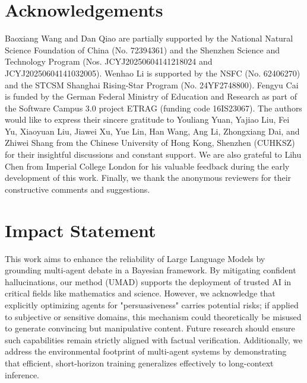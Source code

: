 \documentclass{article}
\theoremstyle{plain}
\theoremstyle{definition}
\theoremstyle{remark}
\begin{document}
\clearpage

\section*{Acknowledgements}
Baoxiang Wang and Dan Qiao are partially supported by the National Natural Science Foundation of China (No. 72394361) and the Shenzhen Science and Technology Program (Nos. JCYJ20250604141218024 and JCYJ20250604141032005). 
Wenhao Li is supported by the NSFC (No. 62406270) and the STCSM Shanghai Rising-Star Program (No. 24YF2748800). Fengyu Cai is funded by the German Federal Ministry of Education and Research as part of the Software Campus 3.0 project ETRAG (funding code 16IS23067). The authors would like to express their sincere gratitude to Youliang Yuan, Yajiao Liu, Fei Yu, Xiaoyuan Liu, Jiawei Xu, Yue Lin, Han Wang, Ang Li, Zhongxiang Dai, and Zhiwei Shang from the Chinese University of Hong Kong, Shenzhen (CUHKSZ) for their insightful discussions and constant support. 
We are also grateful to Lihu Chen from Imperial College London for his valuable feedback during the early development of this work. 
Finally, we thank the anonymous reviewers for their constructive comments and suggestions.

\section*{Impact Statement}

This work aims to enhance the reliability of Large Language Models by grounding multi-agent debate in a Bayesian framework. By mitigating confident hallucinations, our method (UMAD) supports the deployment of trusted AI in critical fields like mathematics and science. However, we acknowledge that explicitly optimizing agents for "persuasiveness" carries potential risks; if applied to subjective or sensitive domains, this mechanism could theoretically be misused to generate convincing but manipulative content. Future research should ensure such capabilities remain strictly aligned with factual verification. Additionally, we address the environmental footprint of multi-agent systems by demonstrating that efficient, short-horizon training generalizes effectively to long-context inference.






\nocite{langley00}
\end{document}
